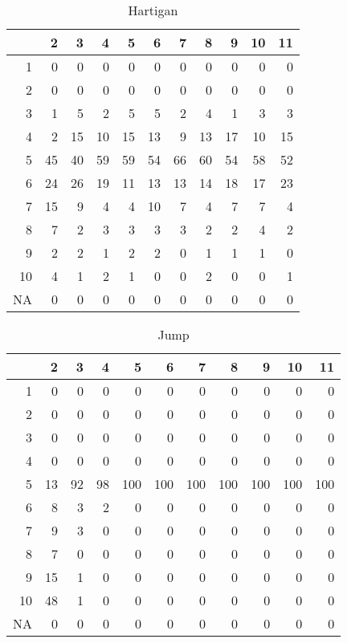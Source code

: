 \documentclass[11pt]{article}
\begin{document}
\begin{table}[H]
\centering
\begin{tabular}{rrrrrrrrrrr}
  \hline
 & 2 & 3 & 4 & 5 & 6 & 7 & 8 & 9 & 10 & 11 \\ 
  \hline
1 & 0 & 0 & 0 & 0 & 0 & 0 & 0 & 0 & 0 & 0 \\ 
  2 & 0 & 0 & 0 & 0 & 0 & 0 & 0 & 0 & 0 & 0 \\ 
  3 & 1 & 5 & 2 & 5 & 5 & 2 & 4 & 1 & 3 & 3 \\ 
  4 & 2 & 15 & 10 & 15 & 13 & 9 & 13 & 17 & 10 & 15 \\ 
  5 & 45 & 40 & 59 & 59 & 54 & 66 & 60 & 54 & 58 & 52 \\ 
  6 & 24 & 26 & 19 & 11 & 13 & 13 & 14 & 18 & 17 & 23 \\ 
  7 & 15 & 9 & 4 & 4 & 10 & 7 & 4 & 7 & 7 & 4 \\ 
  8 & 7 & 2 & 3 & 3 & 3 & 3 & 2 & 2 & 4 & 2 \\ 
  9 & 2 & 2 & 1 & 2 & 2 & 0 & 1 & 1 & 1 & 0 \\ 
  10 & 4 & 1 & 2 & 1 & 0 & 0 & 2 & 0 & 0 & 1 \\ 
  NA & 0 & 0 & 0 & 0 & 0 & 0 & 0 & 0 & 0 & 0 \\ 
   \hline
\end{tabular}
\caption{Hartigan} 
\end{table}
\begin{table}[H]
\centering
\begin{tabular}{rrrrrrrrrrr}
  \hline
 & 2 & 3 & 4 & 5 & 6 & 7 & 8 & 9 & 10 & 11 \\ 
  \hline
1 & 0 & 0 & 0 & 0 & 0 & 0 & 0 & 0 & 0 & 0 \\ 
  2 & 0 & 0 & 0 & 0 & 0 & 0 & 0 & 0 & 0 & 0 \\ 
  3 & 0 & 0 & 0 & 0 & 0 & 0 & 0 & 0 & 0 & 0 \\ 
  4 & 0 & 0 & 0 & 0 & 0 & 0 & 0 & 0 & 0 & 0 \\ 
  5 & 13 & 92 & 98 & 100 & 100 & 100 & 100 & 100 & 100 & 100 \\ 
  6 & 8 & 3 & 2 & 0 & 0 & 0 & 0 & 0 & 0 & 0 \\ 
  7 & 9 & 3 & 0 & 0 & 0 & 0 & 0 & 0 & 0 & 0 \\ 
  8 & 7 & 0 & 0 & 0 & 0 & 0 & 0 & 0 & 0 & 0 \\ 
  9 & 15 & 1 & 0 & 0 & 0 & 0 & 0 & 0 & 0 & 0 \\ 
  10 & 48 & 1 & 0 & 0 & 0 & 0 & 0 & 0 & 0 & 0 \\ 
  NA & 0 & 0 & 0 & 0 & 0 & 0 & 0 & 0 & 0 & 0 \\ 
   \hline
\end{tabular}
\caption{Jump} 
\end{table}
\end{document}
